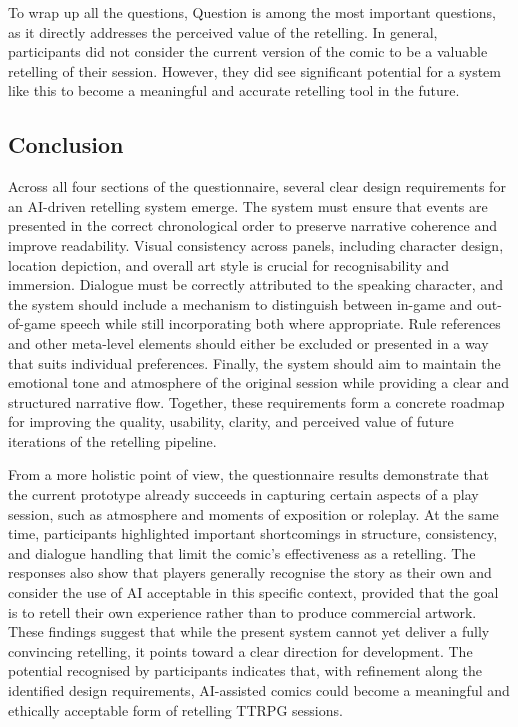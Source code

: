 To wrap up all the questions, Question  is among the most important questions, as it directly addresses the perceived value of the retelling. In general, participants did not consider the current version of the comic to be a valuable retelling of their session. However, they did see significant potential for a system like this to become a meaningful and accurate retelling tool in the future.

\subsection*{Conclusion}
Across all four sections of the questionnaire, several clear design requirements for an AI-driven retelling system emerge. The system must ensure that events are presented in the correct chronological order to preserve narrative coherence and improve readability. Visual consistency across panels, including character design, location depiction, and overall art style is crucial for recognisability and immersion. Dialogue must be correctly attributed to the speaking character, and the system should include a mechanism to distinguish between in-game and out-of-game speech while still incorporating both where appropriate. Rule references and other meta-level elements should either be excluded or presented in a way that suits individual preferences. Finally, the system should aim to maintain the emotional tone and atmosphere of the original session while providing a clear and structured narrative flow. Together, these requirements form a concrete roadmap for improving the quality, usability, clarity, and perceived value of future iterations of the retelling pipeline.

From a more holistic point of view, the questionnaire results demonstrate that the current prototype already succeeds in capturing certain aspects of a play session, such as atmosphere and moments of exposition or roleplay. At the same time, participants highlighted important shortcomings in structure, consistency, and dialogue handling that limit the comic's effectiveness as a retelling. The responses also show that players generally recognise the story as their own and consider the use of AI acceptable in this specific context, provided that the goal is to retell their own experience rather than to produce commercial artwork. These findings suggest that while the present system cannot yet deliver a fully convincing retelling, it points toward a clear direction for development. The potential recognised by participants indicates that, with refinement along the identified design requirements, AI-assisted comics could become a meaningful and ethically acceptable form of retelling TTRPG sessions.

